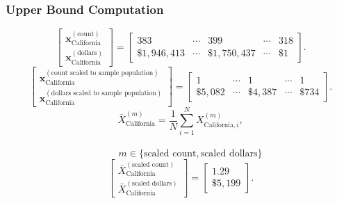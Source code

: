 \subsubsection{Upper Bound Computation}
\[
\begin{bmatrix}
\mathbf{x}_{\text{California}}^{(\text{count})}\\
\mathbf{x}_{\text{California}}^{(\text{dollars})}
\end{bmatrix}
=
\begin{bmatrix}
383 & \cdots & 399 & \cdots & 318\\
\$1{,}946{,}413 & \cdots & \$1{,}750{,}437 & \cdots & \$1
\end{bmatrix}.
\]
\[
\begin{bmatrix}
\mathbf{x}_{\text{California}}^{(\text{count scaled to sample population})}\\
\mathbf{x}_{\text{California}}^{(\text{dollars scaled to sample population})}
\end{bmatrix}
=
\begin{bmatrix}
1 & \cdots & 1 & \cdots & 1\\
\$5{,}082 & \cdots & \$4{,}387 & \cdots & \$734
\end{bmatrix}.
\]
\[
\bar{X}_{\text{California}}^{(m)}
= \frac{1}{N}\sum_{i=1}^{N} X_{\text{California},i}^{(m)},
\]
\\
\[
\qquad
m \in \{\text{scaled count},\text{scaled dollars}\}
\]
\[
\begin{bmatrix}
\bar{X}_{\text{California}}^{(\text{scaled count})}\\
\bar{X}_{\text{California}}^{(\text{scaled dollars})}
\end{bmatrix}
=
\begin{bmatrix}
1.29\\
\$5{,}199
\end{bmatrix}.
\]
